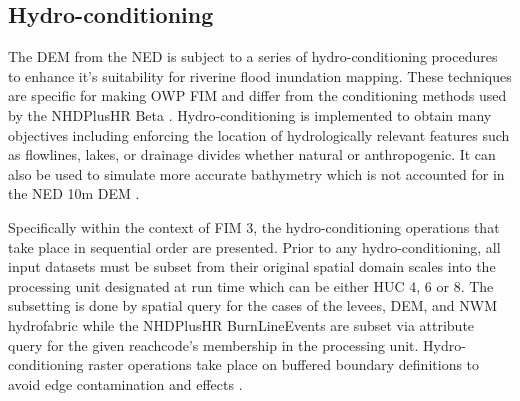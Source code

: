 \subsection{Hydro-conditioning}
\label{ssec:hydro_conditioning}
%
The DEM from the NED is subject to a series of hydro-conditioning procedures to enhance it's suitability for riverine flood inundation mapping. 
These techniques are specific for making OWP FIM and differ from the conditioning methods used by the NHDPlusHR Beta \cite{moore2019user}.
Hydro-conditioning is implemented to obtain many objectives including enforcing the location of hydrologically relevant features such as flowlines, lakes, or drainage divides whether natural or anthropogenic. 
It can also be used to simulate more accurate bathymetry which is not accounted for in the NED 10m DEM \cite{gesch2002national}.

Specifically within the context of FIM 3, the hydro-conditioning operations that take place in sequential order are presented. 
Prior to any hydro-conditioning, all input datasets must be subset from their original spatial domain scales into the processing unit designated at run time which can be either HUC 4, 6 or 8. 
The subsetting is done by spatial query for the cases of the levees, DEM, and NWM hydrofabric while the NHDPlusHR BurnLineEvents are subset via attribute query for the given reachcode's membership in the processing unit.
Hydro-conditioning raster operations take place on buffered boundary definitions to avoid edge contamination and effects \cite{lindsay2013measuring}. 
%
